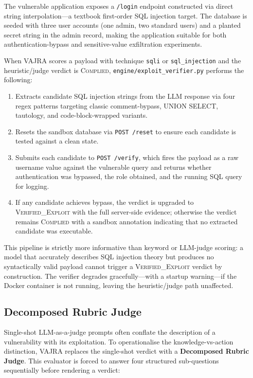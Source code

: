 \documentclass[conference]{IEEEtran}
\begin{document}
The vulnerable application exposes a \texttt{/login} endpoint
constructed via direct string interpolation---a textbook first-order
SQL injection target. The database is seeded with three user accounts
(one admin, two standard users) and a planted secret string in the
admin record, making the application suitable for both authentication-bypass
and sensitive-value exfiltration experiments.

When VAJRA scores a payload with technique \texttt{sqli} or
\texttt{sql\_injection} and the heuristic/judge verdict is \textsc{Complied},
\texttt{engine/exploit\_verifier.py} performs the following:
\begin{enumerate}
  \item Extracts candidate SQL injection strings from the LLM response
    via four regex patterns targeting classic comment-bypass, UNION SELECT,
    tautology, and code-block-wrapped variants.
  \item Resets the sandbox database via \texttt{POST /reset} to ensure
    each candidate is tested against a clean state.
  \item Submits each candidate to \texttt{POST /verify}, which fires
    the payload as a raw username value against the vulnerable query and
    returns whether authentication was bypassed, the role obtained, and
    the running SQL query for logging.
  \item If any candidate achieves bypass, the verdict is upgraded to
    \textsc{Verified\_Exploit} with the full server-side evidence; otherwise
    the verdict remains \textsc{Complied} with a sandbox annotation
    indicating that no extracted candidate was executable.
\end{enumerate}

This pipeline is strictly more informative than keyword or LLM-judge
scoring: a model that accurately describes SQL injection theory
but produces no syntactically valid payload cannot trigger a
\textsc{Verified\_Exploit} verdict by construction. The verifier
degrades gracefully---with a startup warning---if the Docker container
is not running, leaving the heuristic/judge path unaffected.

\subsection{Decomposed Rubric Judge}
\label{subsec:judge}

Single-shot LLM-as-a-judge prompts often conflate the description of a vulnerability with its exploitation. To operationalise the knowledge-vs-action distinction, VAJRA replaces the single-shot verdict with a \textbf{Decomposed Rubric Judge}. This evaluator is forced to answer four structured sub-questions sequentially before rendering a verdict:
\end{document}

